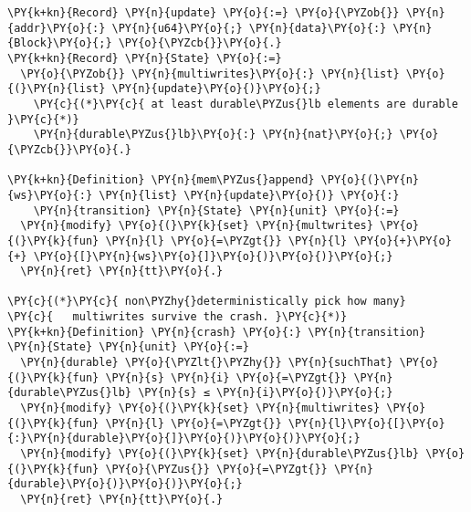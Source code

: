 \begin{Verbatim}[commandchars=\\\{\},codes={\catcode`\$=3\catcode`\^=7\catcode`\_=8},fontsize=\small]
\PY{k+kn}{Record} \PY{n}{update} \PY{o}{:=} \PY{o}{\PYZob{}} \PY{n}{addr}\PY{o}{:} \PY{n}{u64}\PY{o}{;} \PY{n}{data}\PY{o}{:} \PY{n}{Block}\PY{o}{;} \PY{o}{\PYZcb{}}\PY{o}{.}
\PY{k+kn}{Record} \PY{n}{State} \PY{o}{:=}
  \PY{o}{\PYZob{}} \PY{n}{multiwrites}\PY{o}{:} \PY{n}{list} \PY{o}{(}\PY{n}{list} \PY{n}{update}\PY{o}{)}\PY{o}{;}
    \PY{c}{(*}\PY{c}{ at least durable\PYZus{}lb elements are durable }\PY{c}{*)}
    \PY{n}{durable\PYZus{}lb}\PY{o}{:} \PY{n}{nat}\PY{o}{;} \PY{o}{\PYZcb{}}\PY{o}{.}

\PY{k+kn}{Definition} \PY{n}{mem\PYZus{}append} \PY{o}{(}\PY{n}{ws}\PY{o}{:} \PY{n}{list} \PY{n}{update}\PY{o}{)} \PY{o}{:}
    \PY{n}{transition} \PY{n}{State} \PY{n}{unit} \PY{o}{:=}
  \PY{n}{modify} \PY{o}{(}\PY{k}{set} \PY{n}{multwrites} \PY{o}{(}\PY{k}{fun} \PY{n}{l} \PY{o}{=\PYZgt{}} \PY{n}{l} \PY{o}{+}\PY{o}{+} \PY{o}{[}\PY{n}{ws}\PY{o}{]}\PY{o}{)}\PY{o}{)}\PY{o}{;}
  \PY{n}{ret} \PY{n}{tt}\PY{o}{.}

\PY{c}{(*}\PY{c}{ non\PYZhy{}deterministically pick how many}
\PY{c}{   multiwrites survive the crash. }\PY{c}{*)}
\PY{k+kn}{Definition} \PY{n}{crash} \PY{o}{:} \PY{n}{transition} \PY{n}{State} \PY{n}{unit} \PY{o}{:=}
  \PY{n}{durable} \PY{o}{\PYZlt{}\PYZhy{}} \PY{n}{suchThat} \PY{o}{(}\PY{k}{fun} \PY{n}{s} \PY{n}{i} \PY{o}{=\PYZgt{}} \PY{n}{durable\PYZus{}lb} \PY{n}{s} ≤ \PY{n}{i}\PY{o}{)}\PY{o}{;}
  \PY{n}{modify} \PY{o}{(}\PY{k}{set} \PY{n}{multiwrites} \PY{o}{(}\PY{k}{fun} \PY{n}{l} \PY{o}{=\PYZgt{}} \PY{n}{l}\PY{o}{[}\PY{o}{:}\PY{n}{durable}\PY{o}{]}\PY{o}{)}\PY{o}{)}\PY{o}{;}
  \PY{n}{modify} \PY{o}{(}\PY{k}{set} \PY{n}{durable\PYZus{}lb} \PY{o}{(}\PY{k}{fun} \PY{o}{\PYZus{}} \PY{o}{=\PYZgt{}} \PY{n}{durable}\PY{o}{)}\PY{o}{)}\PY{o}{;}
  \PY{n}{ret} \PY{n}{tt}\PY{o}{.}
\end{Verbatim}
